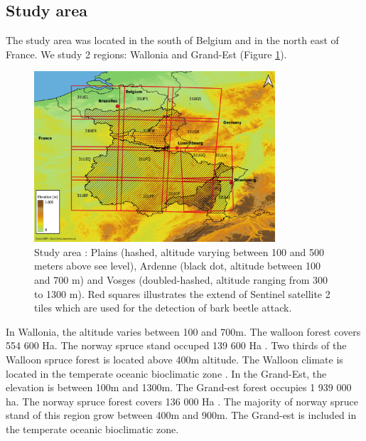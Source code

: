 \documentclass[3p,procedia]{elsarticle}
\begin{document}
\subsection{Study area}
The study area was located in the south of Belgium and in the north east of France. We study 2 regions: Wallonia and Grand-Est (Figure \ref{fig:situ}).
\begin{figure} [htbp] 
	\centering
	\includegraphics[width=0.8\textwidth]{gde.jpeg}
	\caption{Study area : Plains (hashed, altitude varying between 100 and 500 meters above see level), Ardenne (black dot, altitude between 100 and 700 m) and Vosges (doubled-hashed, altitude ranging from 300 to 1300 m). Red squares illustrates the extend of Sentinel satellite 2 tiles which are used for the detection of bark beetle attack.}
	\label{fig:situ}
\end{figure}
In Wallonia, the altitude varies between 100 and 700m.
The walloon forest covers 554 600 Ha. 
The norway spruce stand occuped 139 600 Ha \citep{Alderweireld_2015}. 
Two thirds of the Walloon spruce forest is located above 400m altitude. 
The Walloon climate is located in the temperate oceanic bioclimatic zone \citep{lindner_climate_2010}. 
In the Grand-Est, the elevation is between 100m and 1300m. 
The Grand-est forest occupies 1 939 000 ha. 
The norway spruce forest covers 136 000 Ha \citep{IGN2022}. 
The majority of norway spruce stand of this region grow between 400m and 900m. 
The Grand-est is included in the temperate oceanic bioclimatic zone\citep{lindner_climate_2010}. 
\end{document}
